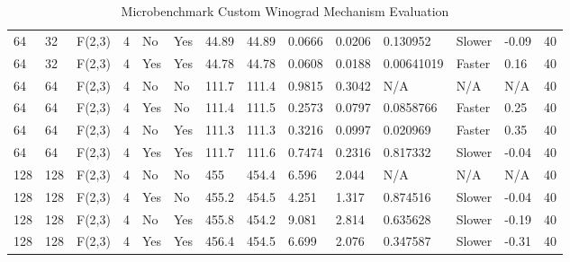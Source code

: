 \begin{table}[t]
\begin{tabular}{llllllllllllll}
    64 &      32 &  F(2,3) &                  4 &    No &       Yes &             44.89 &               44.89 &     0.0666 &   0.0206 &               0.130952 &            Slower &                          -0.09 &    40 \\
    64 &      32 &  F(2,3) &                  4 &   Yes &       Yes &             44.78 &               44.78 &     0.0608 &   0.0188 &             0.00641019 &            Faster &                           0.16 &    40 \\
    64 &      64 &  F(2,3) &                  4 &    No &        No &             111.7 &               111.4 &     0.9815 &   0.3042 &                    N/A &               N/A &                            N/A &    40 \\
    64 &      64 &  F(2,3) &                  4 &   Yes &        No &             111.4 &               111.5 &     0.2573 &   0.0797 &              0.0858766 &            Faster &                           0.25 &    40 \\
    64 &      64 &  F(2,3) &                  4 &    No &       Yes &             111.3 &               111.3 &     0.3216 &   0.0997 &               0.020969 &            Faster &                           0.35 &    40 \\
    64 &      64 &  F(2,3) &                  4 &   Yes &       Yes &             111.7 &               111.6 &     0.7474 &   0.2316 &               0.817332 &            Slower &                          -0.04 &    40 \\
   128 &     128 &  F(2,3) &                  4 &    No &        No &               455 &               454.4 &      6.596 &    2.044 &                    N/A &               N/A &                            N/A &    40 \\
   128 &     128 &  F(2,3) &                  4 &   Yes &        No &             455.2 &               454.5 &      4.251 &    1.317 &               0.874516 &            Slower &                          -0.04 &    40 \\
   128 &     128 &  F(2,3) &                  4 &    No &       Yes &             455.8 &               454.2 &      9.081 &    2.814 &               0.635628 &            Slower &                          -0.19 &    40 \\
   128 &     128 &  F(2,3) &                  4 &   Yes &       Yes &             456.4 &               454.5 &      6.699 &    2.076 &               0.347587 &            Slower &                          -0.31 &    40 \\
\bottomrule
\end{tabular}
\caption{Microbenchmark Custom Winograd Mechanism Evaluation}
\end{table}
